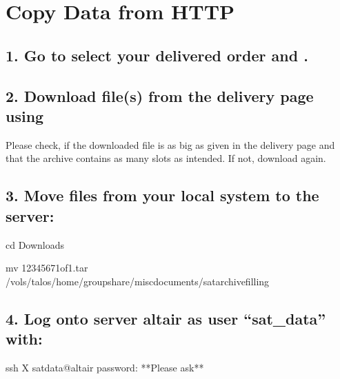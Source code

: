 \documentclass[letterpaper,10pt,english]{sphinxmanual}
\begin{document}
\chapter{Copy Data from HTTP}
\label{\detokenize{copy_data_HTTP:copy-data-from-http}}\label{\detokenize{copy_data_HTTP::doc}}


\section{1. Go to  select your delivered order and .}
\label{\detokenize{copy_data_HTTP:go-to-order-status-select-your-delivered-order-and-open-online-delivery-page}}


\section{2. Download file(s) from the delivery page using }
\label{\detokenize{copy_data_HTTP:download-file-s-from-the-delivery-page-using-right-click-save-file-under}}
Please check, if the downloaded file is as big as given in the delivery
page and that the archive contains as many slots as intended. If not, download again.


\section{3. Move files from your local system to the  server:}
\label{\detokenize{copy_data_HTTP:move-files-from-your-local-system-to-the-talos-server}}
\begin{sphinxVerbatim}[commandchars=\\\{\}]
cd Downloads

mv 1234567\PYGZhy{}1of1.tar /vols/talos/home/group\PYGZbs{}\PYGZus{}share/misc\PYGZbs{}\PYGZus{}documents/sat\PYGZbs{}\PYGZus{}archive\PYGZbs{}\PYGZus{}filling
\end{sphinxVerbatim}


\section{4. Log onto server altair as user “sat\_data” with:}
\label{\detokenize{copy_data_HTTP:log-onto-server-altair-as-user-sat-data-with}}
\begin{sphinxVerbatim}[commandchars=\\\{\}]
ssh \PYGZhy{}X sat\PYGZbs{}\PYGZus{}data\PYGZbs{}@altair
password: **Please ask**
\end{sphinxVerbatim}
\end{document}
